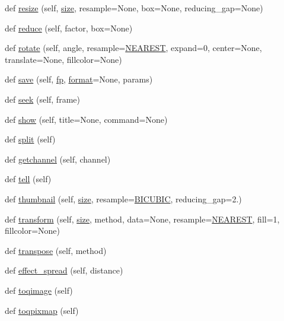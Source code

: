 \begin{DoxyCompactItemize}
\item 
def \hyperlink{classPIL_1_1Image_1_1Image_a6a1cd79a8541edf02c0fb94127b9e217}{resize} (self, \hyperlink{classPIL_1_1Image_1_1Image_ae9939a80d0ea9392d8db8556353b2585}{size}, resample=None, box=None, reducing\+\_\+gap=None)
\item 
def \hyperlink{classPIL_1_1Image_1_1Image_a4a2352ec3f2155b13e8677188bbee94b}{reduce} (self, factor, box=None)
\item 
def \hyperlink{classPIL_1_1Image_1_1Image_a3f95cddf9b9e284dc05f6e2d633d5fbf}{rotate} (self, angle, resample=\hyperlink{namespacePIL_1_1Image_afd842ab6c443c96339eb08e18ba4d206}{N\+E\+A\+R\+E\+ST}, expand=0, center=None, translate=None, fillcolor=None)
\item 
def \hyperlink{classPIL_1_1Image_1_1Image_a8d5e8699818c2f558089729d28f34419}{save} (self, \hyperlink{classPIL_1_1Image_1_1Image_a96deddd6e1e06bf4c25e974ea9f390fe}{fp}, \hyperlink{classPIL_1_1Image_1_1Image_a0b96af3d05c50bcbc01278bc87b84d0e}{format}=None, params)
\item 
def \hyperlink{classPIL_1_1Image_1_1Image_aacafb6c8dc13709cc40aaee406be8fb0}{seek} (self, frame)
\item 
def \hyperlink{classPIL_1_1Image_1_1Image_ad8a959c859f9180848f9de3b12896749}{show} (self, title=None, command=None)
\item 
def \hyperlink{classPIL_1_1Image_1_1Image_a00b23083c84ef92778fd0b189141d579}{split} (self)
\item 
def \hyperlink{classPIL_1_1Image_1_1Image_a35d92bb4697d43598424980392165907}{getchannel} (self, channel)
\item 
def \hyperlink{classPIL_1_1Image_1_1Image_ab9cf79bf2f3587eeafb45d6c60068f24}{tell} (self)
\item 
def \hyperlink{classPIL_1_1Image_1_1Image_a66e41b966325017a5322fb48eedacc13}{thumbnail} (self, \hyperlink{classPIL_1_1Image_1_1Image_ae9939a80d0ea9392d8db8556353b2585}{size}, resample=\hyperlink{namespacePIL_1_1Image_a3824ac5a0532aa60f7072af889d88e59}{B\+I\+C\+U\+B\+IC}, reducing\+\_\+gap=2.)
\item 
def \hyperlink{classPIL_1_1Image_1_1Image_ae0fd99f6ed6bd31d4ba201c136242a20}{transform} (self, \hyperlink{classPIL_1_1Image_1_1Image_ae9939a80d0ea9392d8db8556353b2585}{size}, method, data=None, resample=\hyperlink{namespacePIL_1_1Image_afd842ab6c443c96339eb08e18ba4d206}{N\+E\+A\+R\+E\+ST}, fill=1, fillcolor=None)
\item 
def \hyperlink{classPIL_1_1Image_1_1Image_ad00b1bf1c35d9f4308e4b5abd18fcc56}{transpose} (self, method)
\item 
def \hyperlink{classPIL_1_1Image_1_1Image_a1b056ef9031c313a94225f4272ee1867}{effect\+\_\+spread} (self, distance)
\item 
def \hyperlink{classPIL_1_1Image_1_1Image_a697bef5a15ec1db43991020bfe6690d1}{toqimage} (self)
\item 
def \hyperlink{classPIL_1_1Image_1_1Image_a46366554e7dcf41798ecf43e7156edce}{toqpixmap} (self)
\end{DoxyCompactItemize}
